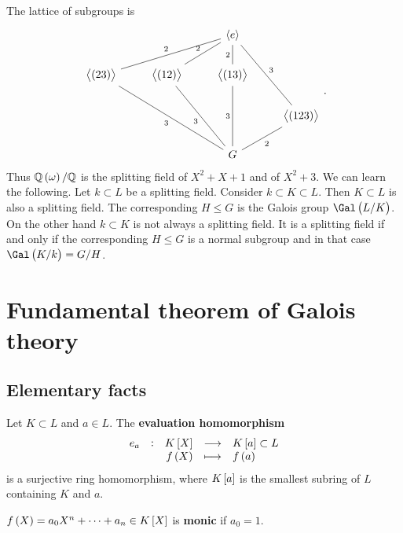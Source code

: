 The lattice of subgroups is
$$
\begin{tikzcd}
& & \abr{e} & \\
\abr{\br{23}} \arrow[dash]{urr}{2} & \abr{\br{12}} \arrow[dash]{ur}{2} & \abr{\br{13}} \arrow[dash]{u}{2} & \\
& & & \abr{\br{123}} \arrow[dash]{uul}[swap]{3} \\
& & G \arrow[dash]{uull}{3} \arrow[dash]{uul}{3} \arrow[dash]{uu}{3} \arrow[dash]{ur}[swap]{2} &
\end{tikzcd}.
$$
Thus $ \QQ\br{\omega} / \QQ $ is the splitting field of $ X^2 + X + 1 $ and of $ X^2 + 3 $. We can learn the following. Let $ k \subset L $ be a splitting field. Consider $ k \subset K \subset L $. Then $ K \subset L $ is also a splitting field. The corresponding $ H \le G $ is the Galois group $ \Gal\br{L / K} $. On the other hand $ k \subset K $ is not always a splitting field. It is a splitting field if and only if the corresponding $ H \le G $ is a normal subgroup and in that case $ \Gal\br{K / k} = G / H $.

\pagebreak

\section{Fundamental theorem of Galois theory}

\subsection{Elementary facts}


Let $ K \subset L $ and $ a \in L $. The \textbf{evaluation homomorphism}
$$ \function[e_a]{K\sbr{X}}{K\sbr{a} \subset L}{f\br{X}}{f\br{a}} $$
is a surjective ring homomorphism, where $ K\sbr{a} $ is the smallest subring of $ L $ containing $ K $ and $ a $.

\begin{definition}
$ f\br{X} = a_0X^n + \dots + a_n \in K\sbr{X} $ is \textbf{monic} if $ a_0 = 1 $.
\end{definition}

